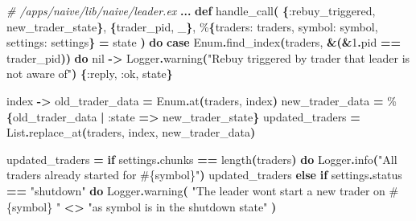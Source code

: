 \documentclass[
  oneside]{book}
\newenvironment{Shaded}{\begin{snugshade}}{\end{snugshade}}
\newcommand{\CommentTok}[1]{\textcolor[rgb]{0.56,0.35,0.01}{\textit{#1}}}
\newcommand{\ConstantTok}[1]{\textcolor[rgb]{0.56,0.35,0.01}{#1}}
\newcommand{\ControlFlowTok}[1]{\textcolor[rgb]{0.13,0.29,0.53}{\textbf{#1}}}
\newcommand{\DecValTok}[1]{\textcolor[rgb]{0.00,0.00,0.81}{#1}}
\newcommand{\FunctionTok}[1]{\textcolor[rgb]{0.13,0.29,0.53}{\textbf{#1}}}
\newcommand{\KeywordTok}[1]{\textcolor[rgb]{0.13,0.29,0.53}{\textbf{#1}}}
\newcommand{\NormalTok}[1]{#1}
\newcommand{\OperatorTok}[1]{\textcolor[rgb]{0.81,0.36,0.00}{\textbf{#1}}}
\newcommand{\OtherTok}[1]{\textcolor[rgb]{0.56,0.35,0.01}{#1}}
\newcommand{\StringTok}[1]{\textcolor[rgb]{0.31,0.60,0.02}{#1}}
\newcommand{\VariableTok}[1]{\textcolor[rgb]{0.00,0.00,0.00}{#1}}
\begin{document}
\begin{Shaded}
\begin{Highlighting}[]
\CommentTok{\# /apps/naive/lib/naive/leader.ex}
  \OperatorTok{...}
  \KeywordTok{def}\NormalTok{ handle\_call}\FunctionTok{(}
        \FunctionTok{\{}\VariableTok{:rebuy\_triggered}\NormalTok{, new\_trader\_state}\FunctionTok{\}}\NormalTok{,}
        \FunctionTok{\{}\NormalTok{trader\_pid, \_}\FunctionTok{\}}\NormalTok{,}
\NormalTok{        \%}\FunctionTok{\{}\VariableTok{traders:}\NormalTok{ traders, }\VariableTok{symbol:}\NormalTok{ symbol, }\VariableTok{settings:}\NormalTok{ settings}\FunctionTok{\}} \OperatorTok{=}\NormalTok{ state}
      \FunctionTok{)} \KeywordTok{do}
    \KeywordTok{case} \ConstantTok{Enum}\OperatorTok{.}\NormalTok{find\_index}\FunctionTok{(}\NormalTok{traders, }\OperatorTok{\&}\FunctionTok{(}\OperatorTok{\&}\DecValTok{1}\OperatorTok{.}\NormalTok{pid }\OperatorTok{==}\NormalTok{ trader\_pid}\FunctionTok{))} \KeywordTok{do}
      \ConstantTok{nil} \OperatorTok{{-}\textgreater{}}
        \ConstantTok{Logger}\OperatorTok{.}\NormalTok{warning}\FunctionTok{(}\StringTok{"Rebuy triggered by trader that leader is not aware of"}\FunctionTok{)}
        \FunctionTok{\{}\VariableTok{:reply}\NormalTok{, }\VariableTok{:ok}\NormalTok{, state}\FunctionTok{\}}

\NormalTok{      index }\OperatorTok{{-}\textgreater{}}
\NormalTok{        old\_trader\_data }\OperatorTok{=} \ConstantTok{Enum}\OperatorTok{.}\NormalTok{at}\FunctionTok{(}\NormalTok{traders, index}\FunctionTok{)}
\NormalTok{        new\_trader\_data }\OperatorTok{=}\NormalTok{ \%}\FunctionTok{\{}\NormalTok{old\_trader\_data }\OperatorTok{|} \VariableTok{:state} \OperatorTok{=\textgreater{}}\NormalTok{ new\_trader\_state}\FunctionTok{\}}
\NormalTok{        updated\_traders }\OperatorTok{=} \ConstantTok{List}\OperatorTok{.}\NormalTok{replace\_at}\FunctionTok{(}\NormalTok{traders, index, new\_trader\_data}\FunctionTok{)}

\NormalTok{        updated\_traders }\OperatorTok{=}
          \ControlFlowTok{if}\NormalTok{ settings}\OperatorTok{.}\NormalTok{chunks }\OperatorTok{==}\NormalTok{ length}\FunctionTok{(}\NormalTok{traders}\FunctionTok{)} \KeywordTok{do}
            \ConstantTok{Logger}\OperatorTok{.}\NormalTok{info}\FunctionTok{(}\StringTok{"All traders already started for }\OtherTok{\#\{}\NormalTok{symbol}\OtherTok{\}}\StringTok{"}\FunctionTok{)}
\NormalTok{            updated\_traders}
          \ControlFlowTok{else}
            \ControlFlowTok{if}\NormalTok{ settings}\OperatorTok{.}\NormalTok{status }\OperatorTok{==} \StringTok{"shutdown"} \KeywordTok{do}
              \ConstantTok{Logger}\OperatorTok{.}\NormalTok{warning}\FunctionTok{(}
                \StringTok{"The leader won\textquotesingle{}t start a new trader on }\OtherTok{\#\{}\NormalTok{symbol}\OtherTok{\}}\StringTok{ "} \OperatorTok{\textless{}\textgreater{}}
                  \StringTok{"as symbol is in the \textquotesingle{}shutdown\textquotesingle{} state"}
              \FunctionTok{)}


\end{Highlighting}
\end{Shaded}
\end{document}
